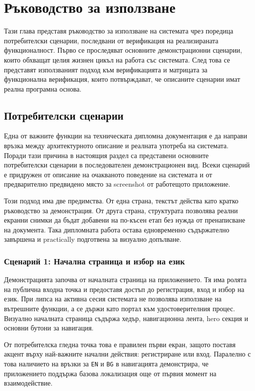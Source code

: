\section{Ръководство за използване}

Тази глава представя ръководство за използване на системата чрез поредица потребителски сценарии, последвани от верификация на реализираната функционалност. Първо се проследяват основните демонстрационни сценарии, които обхващат целия жизнен цикъл на работа със системата. След това се представят използваният подход към верификацията и матрицата за функционална верификация, които потвърждават, че описаните сценарии имат реална програмна основа.

\subsection{Потребителски сценарии}

Една от важните функции на техническата дипломна документация е да направи връзка между архитектурното описание и реалната употреба на системата. Поради тази причина в настоящия раздел са представени основните потребителски сценарии в последователен демонстрационен вид. Всеки сценарий е придружен от описание на очакваното поведение на системата и от предварително предвидено място за screenshot от работещото приложение.

Този подход има две предимства. От една страна, текстът действа като кратко ръководство за демонстрация. От друга страна, структурата позволява реални екранни снимки да бъдат добавени на по-късен етап без нужда от пренаписване на документа. Така дипломната работа остава едновременно съдържателно завършена и practically подготвена за визуално допълване.

\subsubsection{Сценарий 1: Начална страница и избор на език}

Демонстрацията започва от началната страница на приложението. Тя има ролята на публична входна точка и предоставя достъп до регистрация, вход и избор на език. При липса на активна сесия системата не позволява използване на вътрешните функции, а се държи като портал към удостоверителния процес. Визуално началната страница съдържа хедър, навигационна лента, hero секция и основни бутони за навигация.

От потребителска гледна точка това е правилен първи екран, защото поставя акцент върху най-важните начални действия: регистриране или вход. Паралелно с това наличието на връзки за \texttt{EN} и \texttt{BG} в навигацията демонстрира, че приложението поддържа базова локализация още от първия момент на взаимодействие.

